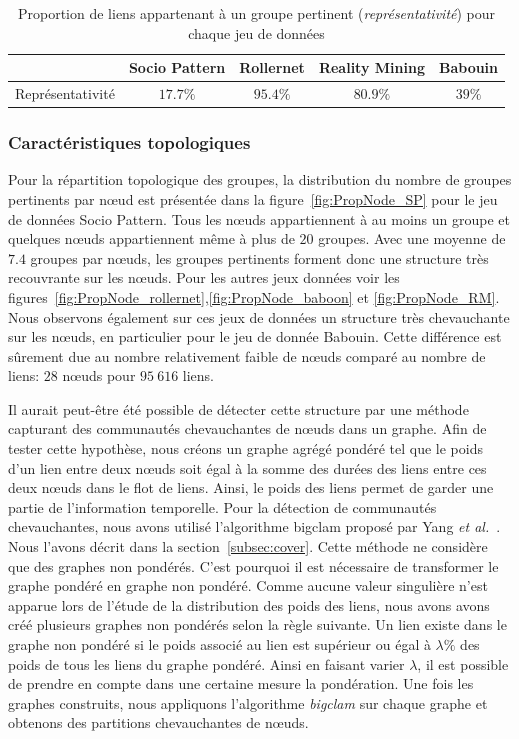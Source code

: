 \begin{table}
\centering
\begin{tabular}{|c|c|c|c|c|}
\hline \rule[-1ex]{0pt}{3.5ex}
 & Socio Pattern & Rollernet  & Reality Mining & Babouin \\
\hline
Représentativité & $17.7\%$ & $95.4\%$ & $80.9\%$ & $39\%$ \\

\hline
\end{tabular}
\caption{Proportion de liens appartenant à un groupe pertinent (\emph{représentativité}) pour chaque jeu de données}
\label{tab:res_representativite}       %
\end{table}


\subsubsection{Caractéristiques topologiques}
Pour la répartition topologique des groupes, la distribution du nombre de groupes pertinents par n\oe{}ud est présentée dans la figure~\ref{fig:PropNode_SP} pour le jeu de données Socio Pattern.
Tous les n\oe{}uds appartiennent à au moins un groupe et quelques n\oe{}uds appartiennent même à plus de $20$ groupes.
Avec une moyenne de $7.4$ groupes par n\oe{}uds, les groupes pertinents forment donc une structure très recouvrante sur les n\oe{}uds.
Pour les autres jeux données voir les figures~\ref{fig:PropNode_rollernet},\ref{fig:PropNode_baboon} et \ref{fig:PropNode_RM}.
Nous observons également sur ces jeux de données un structure très chevauchante sur les n\oe{}uds, en particulier pour le jeu de donnée Babouin.
Cette différence est sûrement due au nombre relativement faible de n\oe{}uds comparé au nombre de liens: $28$ n\oe{}uds pour $95\ 616$ liens.

\bigskip

Il aurait peut-être été possible de détecter cette structure par une méthode capturant des communautés chevauchantes de n\oe{}uds dans un graphe.
Afin de tester cette hypothèse, nous créons un graphe agrégé pondéré tel que le poids d'un lien entre deux n\oe{}uds soit égal à la somme des durées des liens entre ces deux n\oe{}uds dans le flot de liens.
Ainsi, le poids des liens permet de garder une partie de l'information temporelle.
Pour la détection de communautés chevauchantes, nous avons utilisé l'algorithme bigclam proposé par Yang \emph{et al.}~\cite{Yang2013}.
Nous l'avons décrit dans la section~\ref{subsec:cover}.
Cette méthode ne considère que des graphes non pondérés.
C'est pourquoi il est nécessaire de transformer le graphe pondéré en graphe non pondéré.
Comme aucune valeur singulière n'est apparue lors de l'étude de la distribution des poids des liens, nous avons avons créé plusieurs graphes non pondérés selon la règle suivante.
Un lien existe dans le graphe non pondéré si le poids associé au lien est supérieur ou égal à $\lambda\%$ des poids de tous les liens du graphe pondéré.
Ainsi en faisant varier $\lambda$, il est possible de prendre en compte dans une certaine mesure la pondération.
Une fois les graphes construits, nous appliquons l'algorithme \emph{bigclam} sur chaque graphe et obtenons des partitions chevauchantes de n\oe{}uds.

